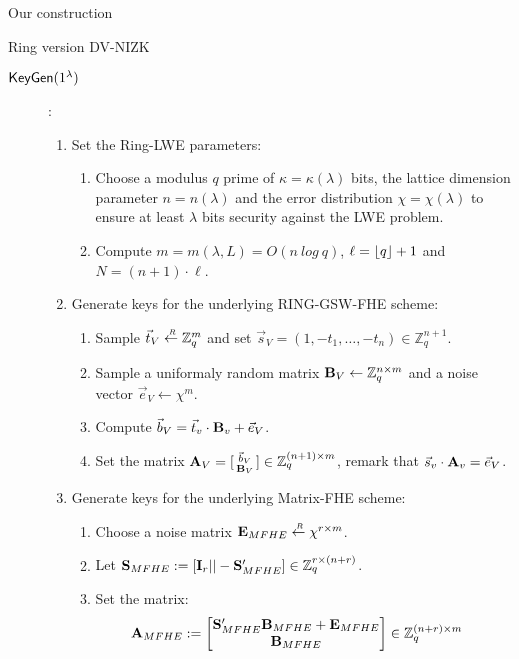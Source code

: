 \begin{section}{Our construction}
\begin{subsection}{Ring version DV-NIZK}
 \begin{description}
    \item[${\mathsf{KeyGen}}(1^\lambda)$]:
      \begin{enumerate}
      \item Set the Ring-LWE parameters:
        \begin{enumerate}
        \item Choose a modulus $q$ prime of $\kappa = \kappa(\lambda)$ bits, the lattice dimension parameter $n = n(\lambda)$ and the error distribution $\chi = \chi(\lambda)$ to ensure at least $\lambda$ bits security against the LWE problem.
        \item Compute $m = m(\lambda, L) = O(n~log~q)$, $\ell = \lfloor q\rfloor+1$ and $N = (n+1) \cdot \ell$.
        \end{enumerate}
      \item Generate keys for the underlying RING-GSW-FHE scheme:
        \begin{enumerate}
        \item Sample $\vec{t}_V \stackrel{{\scriptscriptstyle \mkern4mu R}}{\gets} \mathbb{Z}_q^m$ and set $\vec{s}_V = (1, -t_1, \dots, -t_n) \in \mathbb{Z}_q^{n+1}$.
        \item Sample a uniformaly random matrix $\mathbf{B}_V \gets \mathbb{Z}_q^{n \times m}$ and a noise vector $\vec{e}_V \gets \chi^m$.
        \item Compute $\vec{b}_V = \vec{t}_v \cdot \mathbf{B}_v  + \vec{e}_V$.
        \item Set the matrix $\mathbf{A}_V = [\begin{smallmatrix}\vec{b}_V \\ \mathbf{B}_V \end{smallmatrix}] \in \mathbb{Z}_q^{(n+1) \times m}$, remark that $\vec{s}_v \cdot \mathbf{A}_v = \vec{e}_V$.
        \end{enumerate}
      \item Generate keys for the underlying Matrix-FHE scheme:
        \begin{enumerate}
        \item Choose a noise matrix $\mathbf{E}_{MFHE} \stackrel{{\scriptscriptstyle \mkern4mu R}}{\gets} \chi^{r \times m}$.
        \item Let $\mathbf{S}_{MFHE}:= [\mathbf{I}_r || - \mathbf{S}_{MFHE}'] \in \mathbb{Z}_q^{r \times (n+r)}$.
        \item Set the matrix:
          \begin{align*}
            \mat{A}_{MFHE} &:= \begin{bmatrix}\mat{S}_{MFHE}'\mat{B}_{MFHE} + \mat{E}_{MFHE} \\ \mat{B}_{MFHE}\end{bmatrix} \in \mathbb{Z}_q^{(n+r) \times m}

\end{align*}
\end{enumerate}
\end{enumerate}
\end{description}
\end{subsection}
\end{section}
